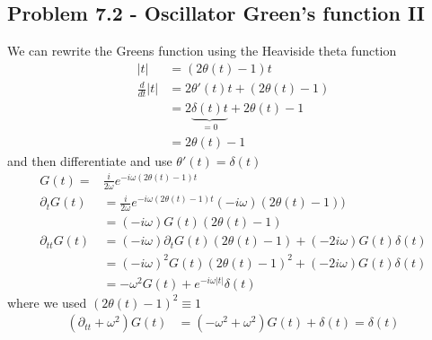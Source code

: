\documentclass[../main.tex]{subfiles}
\begin{document}
\subsection{Problem 7.2 - Oscillator Green's function II}
We can rewrite the Greens function using the Heaviside theta function 
\begin{align}
|t|
&=(2\theta(t)-1)t\\
\frac{d}{dt}|t|
&=2\theta'(t)t+(2\theta(t)-1)\\
&=2\underbrace{\delta(t)t}_{=0}+2\theta(t)-1\\
&=2\theta(t)-1
\end{align}
and then differentiate and use $\theta'(t)=\delta(t)$
\begin{align}
G(t)=&\frac{i}{2\omega}e^{-i\omega(2\theta(t)-1)t}\\
\partial_t G(t)
&=\frac{i}{2\omega}e^{-i\omega(2\theta(t)-1)t}(-i\omega)(2\theta(t)-1))\\
&=(-i\omega)G(t)\left(2\theta(t)-1\right)\\
\partial_{tt} G(t)
&=(-i\omega)\partial_tG(t)\left(2\theta(t)-1\right)+(-2i\omega)G(t)\delta(t)\\
&=(-i\omega)^2G(t)\left(2\theta(t)-1\right)^2+(-2i\omega)G(t)\delta(t)\\
&=-\omega^2G(t)+e^{-i\omega|t|}\delta(t)
\end{align}
where we used $\left(2\theta(t)-1\right)^2\equiv1$
\begin{align}
\left(\partial_{tt}+\omega^2\right)G(t)
&=\left(-\omega^2+\omega^2\right)G(t)+\delta(t)=\delta(t)
\end{align}
\end{document}

